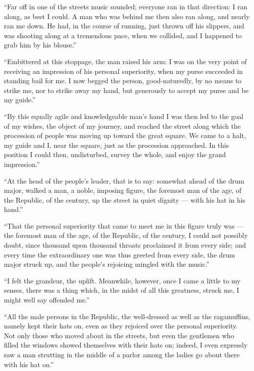 \documentclass[12pt,a4paper]{book}
\begin{document}
``Far off in one of the streets music sounded; everyone ran in that direction: I ran along, as best I could. A man who was behind me then also ran along, and nearly ran me down. He had, in the course of running, just thrown off his slippers, and was shooting along at a tremendous pace, when we collided, and I happened to grab him by his blouse.''

``Embittered at this stoppage, the man raised his arm: I was on the very point of receiving an impression of his personal superiority, when my purse succeeded in standing bail for me. I now begged the person, good-naturedly, by no means to strike me, nor to strike away my hand, but generously to accept my purse and be my guide.''

``By this equally agile and knowledgeable man's hand I was then led to the goal of my wishes, the object of my journey, and reached the street along which the procession of people was moving up toward the great square. We came to a halt, my guide and I, near the square, just as the procession approached. In
this position I could then, undisturbed, survey the whole, and enjoy the grand impression.''

``At the head of the people's leader, that is to say: somewhat ahead of the drum major, walked a man, a noble, imposing figure, the foremost man of the age, of the Republic, of the century, up the street in quiet dignity --- with his hat in his hand.''

``That the personal superiority that came to meet me in this figure truly was --- the foremost man of the age, of the Republic, of the century, I could not possibly doubt, since thousand upon thousand throats proclaimed it from every side; and every time the extraordinary one was thus greeted from every side, the drum major struck up, and the people's rejoicing mingled with the music.''

``I felt the grandeur, the uplift. Meanwhile, however, once I came a little to my senses, there was a thing which, in the midst of all this greatness, struck me, I might well say offended me.''

``All the male persons in the Republic, the well-dressed as well as the ragamuffins, namely kept their hats on, even as they rejoiced over the personal superiority. Not only those who moved about in the streets, but even the gentlemen who filled the windows showed themselves with their hats on; indeed, I even expressly saw a man strutting in the middle of a parlor among the ladies go about there with his hat on.''
\end{document}
